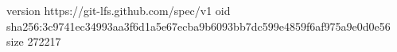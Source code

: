 version https://git-lfs.github.com/spec/v1
oid sha256:3c9741ec34993aa3f6d1a5e67ecba9b6093bb7dc599e4859f6af975a9e0d0e56
size 272217

